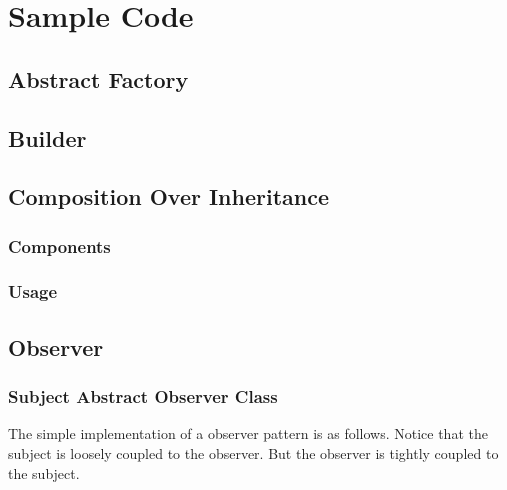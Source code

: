 \section{Sample Code}

\subsection{Abstract Factory}
\label{code:abstract-factory}

\subsection{Builder}
\label{code:builder}

\subsection{Composition Over Inheritance}
\subsubsection{Components}
\label{code:coi-component}
\subsubsection{Usage}
\label{code:coi-usage}

\subsection{Observer}\label{code:observer}
\subsubsection{Subject Abstract Observer Class}
The simple implementation of a observer pattern is as follows. Notice that the subject is loosely coupled to the observer. But the observer is tightly coupled to the subject.

